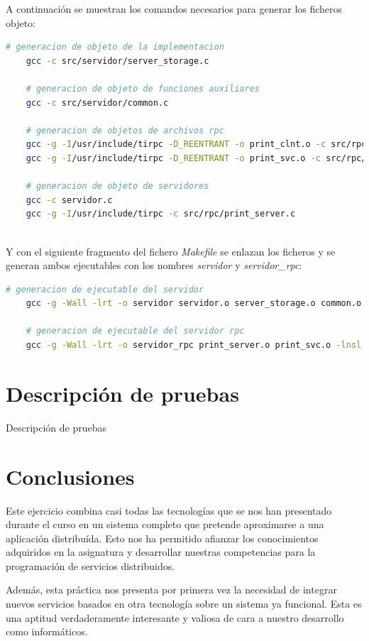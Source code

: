 \documentclass[]{article}
\begin{document}
A continuación se muestran los comandos necesarios para generar los ficheros objeto:

\begin{center}
  \begin{lstlisting}[caption=Compilación de ficheros en ficheros objetos, language=bash]
    # generacion de objeto de la implementacion
    gcc -c src/servidor/server_storage.c
    
    # generacion de objeto de funciones auxiliares
    gcc -c src/servidor/common.c

    # generacion de objetos de archivos rpc
    gcc -g -I/usr/include/tirpc -D_REENTRANT -o print_clnt.o -c src/rpc/print_clnt.c
    gcc -g -I/usr/include/tirpc -D_REENTRANT -o print_svc.o -c src/rpc/print_svc.c

    # generacion de objeto de servidores
    gcc -c servidor.c
    gcc -g -I/usr/include/tirpc -c src/rpc/print_server.c
    
    \end{lstlisting}
\end{center}

Y con el siguiente fragmento del fichero \textit{Makefile} se enlazan los ficheros y se generan ambos ejecutables con los nombres \textit{servidor} y \textit{servidor\_rpc}:

\begin{center}
  \begin{lstlisting}[caption=Generación de ejecutables, language=bash]
    # generacion de ejecutable del servidor
    gcc -g -Wall -lrt -o servidor servidor.o server_storage.o common.o print_clnt.o -lnsl -lpthread -ldl -ltirpc
    
    # generacion de ejecutable del servidor rpc
    gcc -g -Wall -lrt -o servidor_rpc print_server.o print_svc.o -lnsl -lpthread -ldl -ltirpc

    \end{lstlisting}
\end{center}

\section{Descripción de pruebas}
\label{sec:descripcion_de_pruebas}
Descripción de pruebas 

\section{Conclusiones}
\label{sec:conclusiones}
Este ejercicio combina casi todas las tecnologías que se nos han presentado durante el curso en un sistema completo que pretende aproximarse a una aplicación distribuída. Esto nos ha permitido afianzar los conocimientos adquiridos en la asignatura y desarrollar nuestras competencias para la programación de servicios distribuidos. 

Además, esta práctica nos presenta por primera vez la necesidad de integrar nuevos servicios basados en otra tecnología sobre un sistema ya funcional. Esta es una aptitud verdaderamente interesante y valiosa de cara a nuestro desarrollo como informáticos.
\end{document}
